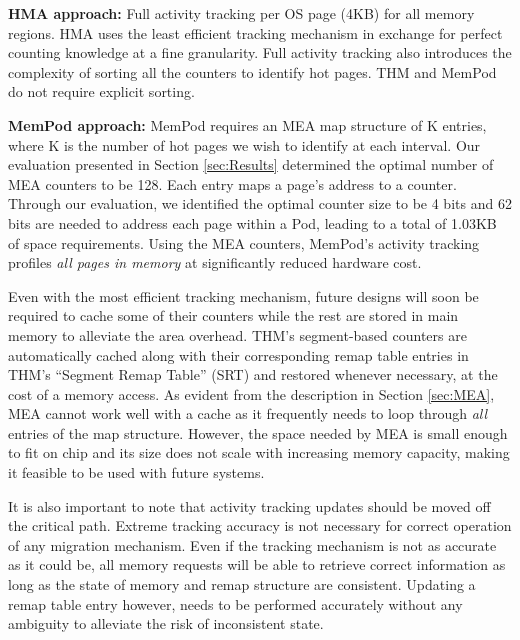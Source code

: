 	\textbf{HMA approach:} Full activity tracking per OS page (4KB) for all memory regions. HMA uses the least efficient tracking mechanism in exchange for perfect counting knowledge at a fine granularity. Full activity tracking also introduces the complexity of sorting all the counters to identify hot pages. THM and MemPod do not require explicit sorting.
	
	\textbf{MemPod approach:} MemPod requires an MEA map structure of K entries, where K is the number of hot pages we wish to identify at each interval. Our evaluation presented in Section \ref{sec:Results} determined the optimal number of MEA counters to be 128. Each entry maps a page's address to a counter. Through our evaluation, we identified the optimal counter size to be 4 bits and 62 bits are needed to address each page within a Pod, leading to a total of 1.03KB of space requirements. Using the MEA counters, MemPod's activity tracking profiles \textit{all pages in memory} at significantly reduced hardware cost. 
	

Even with the most efficient tracking mechanism, future designs will soon be required to cache some of their counters while the rest are stored in main memory to alleviate the area overhead. THM's segment-based counters are automatically cached along with their corresponding remap table entries in THM's ``Segment Remap Table'' (SRT) and restored whenever necessary, at the cost of a memory access. As evident from the description in Section \ref{sec:MEA}, MEA cannot work well with a cache as it frequently needs to loop through \textit{all} entries of the map structure. However, the space needed by MEA is small enough to fit on chip and its size does not scale with increasing memory capacity, making it feasible to be used with future systems.

It is also important to note that activity tracking updates should be moved off the critical path. Extreme tracking accuracy is not necessary for correct operation of any migration mechanism. Even if the tracking mechanism is not as accurate as it could be, all memory requests will be able to retrieve correct information as long as the state of memory and remap structure are consistent. Updating a remap table entry however, needs to be performed accurately without any ambiguity to alleviate the risk of inconsistent state.

